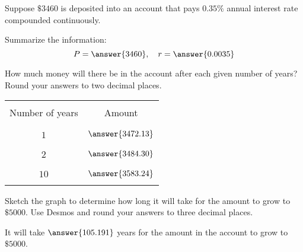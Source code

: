 \documentclass{ximera}
\begin{document}
  \begin{problem}\label{prob:160hom7prob6}
  Suppose $\$3460$ is deposited into an account that pays $0.35\%$ annual interest rate compounded continuously.  
  
  Summarize the information:
  $$P=\answer{3460},\quad r=\answer{0.0035}$$
  
  How much money will there be in the account after each given number of years?  Round your answers to two decimal places.
  \begin{center}
\begin{tabular}{|c|c|}
 \hline
 &   \\
Number of years &  Amount \\
 &  \\
  \hline
  &  \\
 $1$ & $\answer{3472.13}$ \\
  & \\
 \hline
 &  \\
 $2$ & $\answer{3484.30}$ \\
  & \\
 \hline
 &  \\
 $10$ & $\answer{3583.24}$ \\
  & \\
 \hline
   \end{tabular}
\end{center}    
Sketch the graph to determine how long it will take for the amount to grow to  $\$5000$.  Use Desmos and round your answers to three decimal places.
  
  \begin{center}  
\end{center}

It will take $\answer{105.191}$ years for the amount in the account to grow to $\$5000$.  
  \end{problem}
 
  
 
\end{document}
